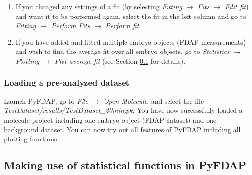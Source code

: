 \documentclass[a4paper,11pt]{article}
\begin{document}
\begin{enumerate}
\item If you changed any settings of a fit (by selecting \textit{Fitting $\rightarrow$ Fits $\rightarrow$ Edit fit}) and want it to be performed again, select the fit in the left column and go to \textit{Fitting $\rightarrow$ Perform Fits $\rightarrow$ Perform fit}.
\item If you have added and fitted multiple embryo objects (FDAP measurements) and wish to find the average fit over all embryo objects, go to \textit{Statistics $\rightarrow$ Plotting $\rightarrow$ Plot average fit} (see Section \ref{sec:average} for details).
\end{enumerate}

\subsubsection{Loading a pre-analyzed dataset}
\label{sec:pre}
Launch PyFDAP, go to \textit{File} $\rightarrow$ \textit{Open Molecule}, and select the file \textit{TestDataset/results/TestDataset\_20min.pk}. You have now successfully loaded a molecule project including one embryo object (FDAP dataset) and one background dataset. You can now try out all features of PyFDAP including all plotting functions. 

\subsection{Making use of statistical functions in PyFDAP}
\label{sec:average}
\end{document}
